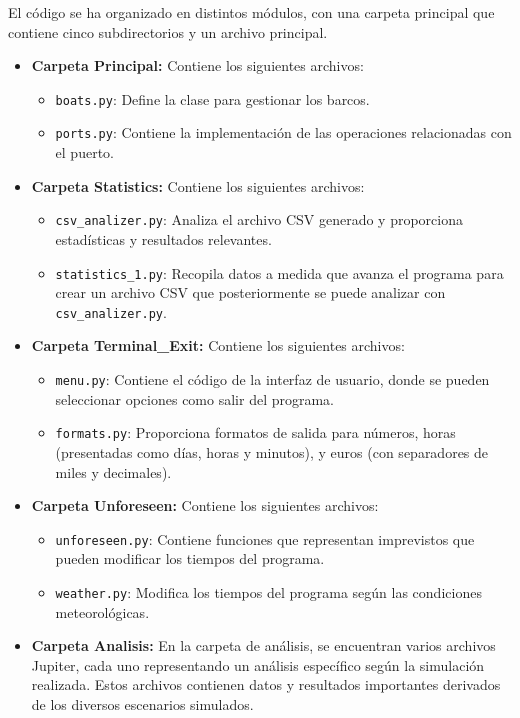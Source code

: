 \documentclass[12pt]{article}
\begin{document}
El código se ha organizado en distintos módulos, con una carpeta principal que contiene cinco subdirectorios y un archivo principal.

\begin{itemize}
    \item \textbf{Carpeta Principal:} Contiene los siguientes archivos:
        \begin{itemize}
            \item \texttt{boats.py}: Define la clase para gestionar los barcos.
            \item \texttt{ports.py}: Contiene la implementación de las operaciones relacionadas con el puerto.
        \end{itemize}
        
    \item \textbf{Carpeta Statistics:} Contiene los siguientes archivos:
        \begin{itemize}
            \item \texttt{csv\_analizer.py}: Analiza el archivo CSV generado y proporciona estadísticas y resultados relevantes.
            \item \texttt{statistics\_1.py}: Recopila datos a medida que avanza el programa para crear un archivo CSV que posteriormente se puede analizar con \texttt{csv\_analizer.py}.
        \end{itemize}
    
    \item \textbf{Carpeta Terminal\_Exit:} Contiene los siguientes archivos:
        \begin{itemize}
            \item \texttt{menu.py}: Contiene el código de la interfaz de usuario, donde se pueden seleccionar opciones como salir del programa.
            \item \texttt{formats.py}: Proporciona formatos de salida para números, horas (presentadas como días, horas y minutos), y euros (con separadores de miles y decimales).
        \end{itemize}
    
    \item \textbf{Carpeta Unforeseen:} Contiene los siguientes archivos:
        \begin{itemize}
            \item \texttt{unforeseen.py}: Contiene funciones que representan imprevistos que pueden modificar los tiempos del programa.
            \item \texttt{weather.py}: Modifica los tiempos del programa según las condiciones meteorológicas.
        \end{itemize}

        \item \textbf{Carpeta Analisis:} 
            En la carpeta de análisis, se encuentran varios archivos Jupiter, cada uno representando un análisis específico según la simulación realizada. Estos archivos contienen datos y resultados importantes derivados de los diversos escenarios simulados.

        
\end{itemize}
\end{document}
